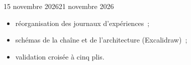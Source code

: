 \begin{fichesuivi}{15 novembre 2026}{21 novembre 2026}

   \begin{travaileffectue}
      \begin{itemize}
         \item réorganisation des journaux d'expériences~;
         \item schémas de la chaîne et de l'architecture (Excalidraw)~;
         \item validation croisée à cinq plis.
      \end{itemize}
   \end{travaileffectue}

   \begin{travailnoneffectue}
   \end{travailnoneffectue}

   \begin{echange}
   \end{echange}

   \begin{planification}
   \end{planification}
\end{fichesuivi}

